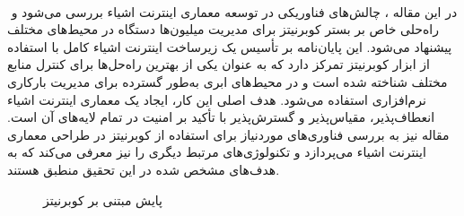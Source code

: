 \paragraph{}{‍
    در این مقاله \cite{Mlynka2022thesis}، چالش‌های فناوریکی در توسعه معماری اینترنت اشیاء بررسی می‌شود و راه‌حلی خاص بر بستر کوبرنیتز برای مدیریت میلیون‌ها دستگاه در محیط‌های مختلف پیشنهاد می‌شود. این پایان‌نامه بر تأسیس یک زیرساخت اینترنت اشیاء کامل با استفاده از ابزار کوبرنیتز تمرکز دارد که به عنوان یکی از بهترین راه‌حل‌ها برای کنترل منابع مختلف شناخته شده است و در محیط‌های ابری به‌طور گسترده برای مدیریت بارکاری نرم‌افزاری استفاده می‌شود. هدف اصلی این کار، ایجاد یک معماری اینترنت اشیاء انعطاف‌پذیر، مقیاس‌پذیر و گسترش‌پذیر با تأکید بر امنیت در تمام لایه‌های آن است. مقاله نیز به بررسی فناوری‌های موردنیاز برای استفاده از کوبرنیتز در طراحی معماری اینترنت اشیاء می‌پردازد و تکنولوژی‌های مرتبط دیگری را نیز معرفی می‌کند که به هدف‌های مشخص شده در این تحقیق منطبق هستند.
    \begin{figure}[H]
        \caption{پایش مبتنی بر کوبرنیتز \cite{Mlynka2022thesis}}
        \label{fig:iot_monitoring}
    \end{figure}
‍}

